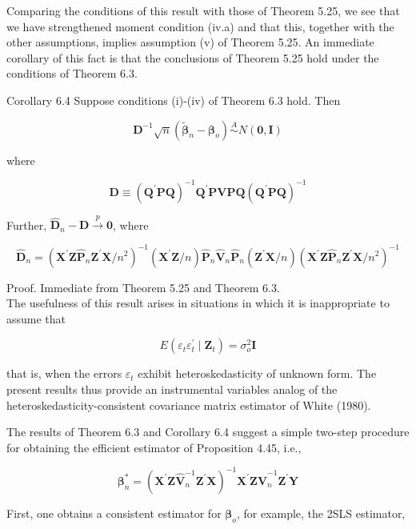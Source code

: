 \documentclass[10pt]{article}
\begin{document}
Comparing the conditions of this result with those of Theorem 5.25, we see that we have strengthened moment condition (iv.a) and that this, together with the other assumptions, implies assumption (v) of Theorem 5.25. An immediate corollary of this fact is that the conclusions of Theorem 5.25 hold under the conditions of Theorem 6.3.

Corollary 6.4 Suppose conditions (i)-(iv) of Theorem 6.3 hold. Then

$$
\mathbf{D}^{-1} \sqrt{n}\left(\tilde{\boldsymbol{\beta}}_{n}-\boldsymbol{\beta}_{o}\right) \stackrel{A}{\sim} N(\mathbf{0}, \mathbf{I})
$$

where

$$
\mathbf{D} \equiv\left(\mathbf{Q}^{\prime} \mathbf{P Q}\right)^{-1} \mathbf{Q}^{\prime} \mathbf{P} \mathbf{V P Q}\left(\mathbf{Q}^{\prime} \mathbf{P Q}\right)^{-1}
$$

Further, $\hat{\mathbf{D}}_{n}-\mathbf{D} \xrightarrow{p} \mathbf{0}$, where

$$
\hat{\mathbf{D}}_{n}=\left(\mathbf{X}^{\prime} \mathbf{Z} \hat{\mathbf{P}}_{n} \mathbf{Z}^{\prime} \mathbf{X} / n^{2}\right)^{-1}\left(\mathbf{X}^{\prime} \mathbf{Z} / n\right) \hat{\mathbf{P}}_{n} \hat{\mathbf{V}}_{n} \hat{\mathbf{P}}_{n}\left(\mathbf{Z}^{\prime} \mathbf{X} / n\right)\left(\mathbf{X}^{\prime} \mathbf{Z} \hat{\mathbf{P}}_{n} \mathbf{Z}^{\prime} \mathbf{X} / n^{2}\right)^{-1}
$$

Proof. Immediate from Theorem 5.25 and Theorem 6.3.\\
The usefulness of this result arises in situations in which it is inappropriate to assume that

$$
E\left(\varepsilon_{t} \varepsilon_{t}^{\prime} \mid \mathbf{Z}_{t}\right)=\sigma_{o}^{2} \mathbf{I}
$$

that is, when the errors $\varepsilon_{t}$ exhibit heteroskedasticity of unknown form. The present results thus provide an instrumental variables analog of the heteroskedasticity-consistent covariance matrix estimator of White (1980).

The results of Theorem 6.3 and Corollary 6.4 suggest a simple two-step procedure for obtaining the efficient estimator of Proposition 4.45, i.e.,

$$
\boldsymbol{\beta}_{n}^{*}=\left(\mathbf{X}^{\prime} \mathbf{Z} \hat{\mathbf{V}}_{n}^{-1} \mathbf{Z}^{\prime} \mathbf{X}\right)^{-1} \mathbf{X}^{\prime} \mathbf{Z} \hat{\mathbf{V}}_{n}^{-1} \mathbf{Z}^{\prime} \mathbf{Y}
$$

First, one obtains a consistent estimator for $\boldsymbol{\beta}_{o}$, for example, the 2SLS estimator,
\end{document}
